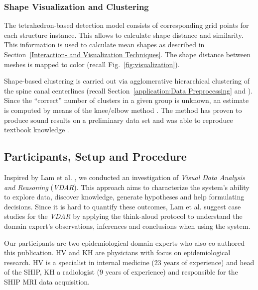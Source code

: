 \documentclass[journal]{style/vgtc} 			          %
\newcommand{\com}[1]{\textcolor{orange}{\uline{#1}}}
\begin{document}
\subsubsection{Shape Visualization and Clustering}
%
The tetrahedron-based detection model consists of corresponding grid points for each structure instance.
%
This allows to calculate shape distance and similarity.
%
This information is used to calculate mean shapes as described in Section~\ref{Interaction- and Visualization Techniques}.
%
The shape distance between meshes is mapped to color (recall Fig.~\ref{fig:visualization}).
%
%

Shape-based clustering is carried out via agglomerative hierarchical clustering of the spine canal centerlines (recall Section~\ref{application:Data Preprocessing} and \cite{Klemm2013VMV}).
%
Since the ``correct'' number of clusters in a given group is unknown, an estimate is computed by means of the knee/elbow method \cite{Salvador2004}.
%
The method has proven to produce sound results on a preliminary data set and was able to reproduce textbook knowledge \cite{Klemm2013VMV}.
\subsection{Participants, Setup and Procedure}
%
%
Inspired by Lam et al. \cite{Lam2012}, we conducted an investigation of \emph{Visual Data Analysis and Reasoning} (\emph{VDAR}).
%
This approach aims to characterize the system's ability to explore data, discover knowledge, generate hypotheses and help formulating decisions.
%
Since it is hard to quantify these outcomes, Lam et al. suggest case studies for the \emph{VDAR} by applying the think-aloud protocol to understand the domain expert's observations, inferences and conclusions when using the system.

Our participants are two epidemiological domain experts who also co-authored this publication.
%
HV and KH are physicians with focus on epidemiological research.
%
HV is a specialist in internal medicine (23 years of experience) and head of the SHIP, KH a radiologist (9 years of experience) and responsible for the SHIP MRI data acquisition. %
%
%
\end{document}
